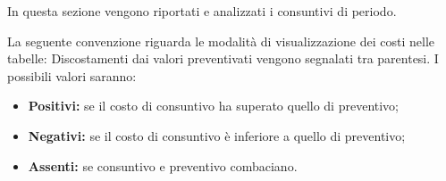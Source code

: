 
In questa sezione vengono riportati e analizzati i consuntivi di periodo.

La seguente convenzione riguarda le modalità di visualizzazione dei costi nelle tabelle:
Discostamenti dai valori preventivati vengono segnalati tra parentesi. I possibili valori saranno:

\begin{itemize}
\item \textbf{Positivi:} se il costo di consuntivo ha superato quello di preventivo;
\item \textbf{Negativi:} se il costo di consuntivo è inferiore a quello di preventivo;
\item \textbf{Assenti:} se consuntivo e preventivo combaciano.
\end{itemize}



\pagebreak
